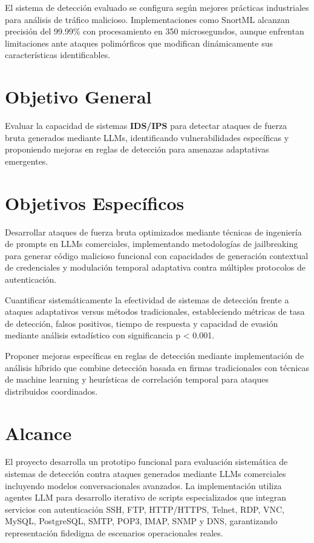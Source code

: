 El sistema de detección evaluado se configura según mejores prácticas industriales para análisis de tráfico malicioso. Implementaciones como SnortML \cite{Tanaka2024SnortML} alcanzan precisión del 99.99\% con procesamiento en 350 microsegundos, aunque enfrentan limitaciones ante ataques polimórficos que modifican dinámicamente sus características identificables.

\section{Objetivo General}

Evaluar la capacidad de sistemas \textbf{IDS/IPS} para detectar ataques de fuerza bruta generados mediante LLMs, identificando vulnerabilidades específicas y proponiendo mejoras en reglas de detección para amenazas adaptativas emergentes.

\section{Objetivos Específicos}

Desarrollar ataques de fuerza bruta optimizados mediante técnicas de ingeniería de prompts en LLMs comerciales, implementando metodologías de jailbreaking para generar código malicioso funcional con capacidades de generación contextual de credenciales y modulación temporal adaptativa contra múltiples protocolos de autenticación.

Cuantificar sistemáticamente la efectividad de sistemas de detección frente a ataques adaptativos versus métodos tradicionales, estableciendo métricas de tasa de detección, falsos positivos, tiempo de respuesta y capacidad de evasión mediante análisis estadístico con significancia p < 0.001.

Proponer mejoras específicas en reglas de detección mediante implementación de análisis híbrido que combine detección basada en firmas tradicionales con técnicas de machine learning y heurísticas de correlación temporal para ataques distribuidos coordinados.

\section{Alcance}

El proyecto desarrolla un prototipo funcional para evaluación sistemática de sistemas de detección contra ataques generados mediante LLMs comerciales incluyendo modelos conversacionales avanzados. La implementación utiliza agentes LLM para desarrollo iterativo de scripts especializados que integran servicios con autenticación SSH, FTP, HTTP/HTTPS, Telnet, RDP, VNC, MySQL, PostgreSQL, SMTP, POP3, IMAP, SNMP y DNS, garantizando representación fidedigna de escenarios operacionales reales.

